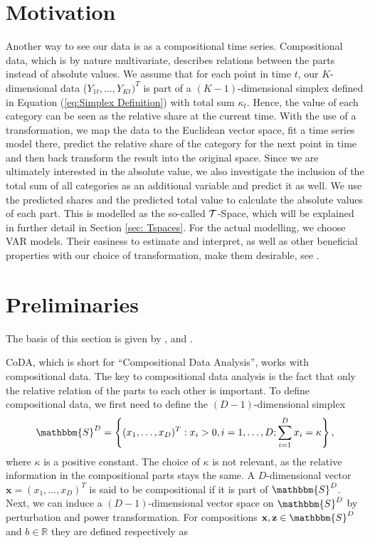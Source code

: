 \section{Motivation}
\label{sec: Coda Motivation}

Another way to see our data is as a compositional time series. Compositional data, which is by nature multivariate, describes relations between the parts instead of absolute values. We assume that for each point in time $t$, our $K$-dimensional data ($Y_{1t},\ldots,Y_{Kt})^T$ is part of a $(K-1)$-dimensional simplex defined in Equation (\ref{eq:Simplex Definition}) with total sum $\kappa_t$. Hence, the value of each category can be seen as the relative share at the current time. With the use of a transformation, we map the data to the Euclidean vector space, fit a time series model there, predict the relative share of the category for the next point in time and then back transform the result into the original space. Since we are ultimately interested in the absolute value, we also investigate the inclusion of the total sum of all categories as an additional variable and predict it as well. We use the predicted shares and the predicted total value to calculate the absolute values of each part. This is modelled as the so-called $\mathcal{T}$-Space, which will be explained in further detail in Section \ref{sec: Tspaces}. For the actual modelling, we choose VAR models. Their easiness to estimate and interpret, as well as other beneficial properties with our choice of transformation, make them desirable, see \textcite{Kynclova:2015}. 


\section{Preliminaries}
\label{sec: Coda Preliminaries}
The basis of this section is given by \textcite{Kynclova:2015}, \textcite{Egozcue:2003} and \textcite{Filzmoser:2020}.

CoDA, which is short for ``Compositional Data Analysis'', works with compositional data. The key to compositional data analysis is the fact that only the relative relation of the parts to each other is important. To define compositional data, we first need to define the $(D-1)$-dimensional simplex
	\begin{equation}
	\mathbbm{S}^D = \left\{(x_1,\ldots, x_D)^T: x_i > 0, i =1,\ldots,D; \sum_{i=1}^{D}x_i=\kappa  \right\},
	\label{eq:Simplex Definition}
	\end{equation}
%
where $\kappa$ is a positive constant. The choice of $\kappa$ is not relevant, as the relative information in the compositional parts stays the same.  A $D$-dimensional vector $\textbf{x} = (x_1,\ldots,x_D)^T$ is said to be compositional if it is part of $\mathbbm{S}^D$. Next, we can induce a $(D-1)$-dimensional vector space on $\mathbbm{S}^D$ by perturbation and power transformation. For compositions $\textbf{x},\textbf{z} \in \mathbbm{S}^D$ and $b \in \mathbb{R}$ they are defined respectively as 

